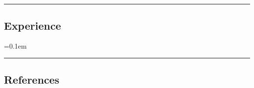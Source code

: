 \documentclass[10pt,letterpaper]{article}
\begin{document}
\hrule
\vspace{-0.4em}
\subsection*{Experience}

\begin{itemize}
  \parskip=0.1em

  
  
  
  
\end{itemize}

\hrule
\vspace{-0.4em}
\subsection*{References}
\begin{itemize}
  
\end{itemize}
\end{document}
